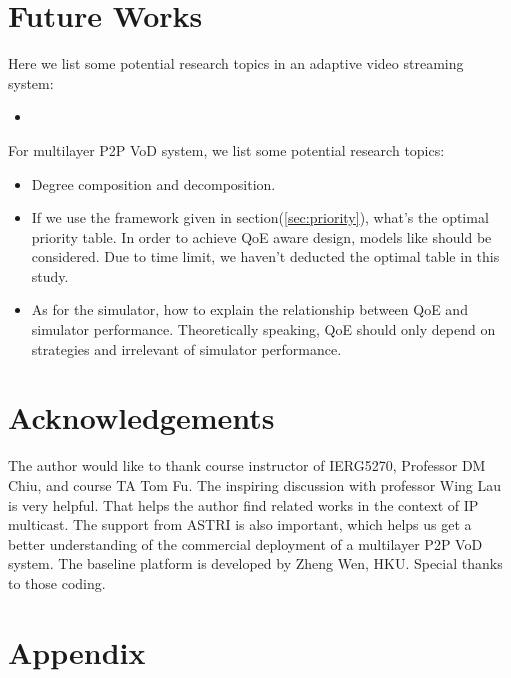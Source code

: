 \documentclass[11pt,a4paper]{article}
\begin{document}
\section{Future Works}

Here we list some potential research topics in an adaptive video streaming 
system:
\begin{itemize}
	\item 
\end{itemize} 

For multilayer P2P VoD system, we list some potential research topics:
\begin{itemize}
	\item Degree composition and decomposition. 
	\item If we use the framework given in section(\ref{sec:priority}), 
	what's the optimal priority table. In order to achieve QoE aware design, 
	models like \cite{wang2011-perceptual} should be considered. Due to 
	time limit, we haven't deducted the optimal table in this study. 
	\item As for the simulator, how to explain the relationship between 
	QoE and simulator performance. Theoretically speaking, QoE should only 
	depend on strategies and irrelevant of simulator performance. 
\end{itemize}



\section*{Acknowledgements}

The author would like to thank course instructor of IERG5270, Professor
DM Chiu, and course TA Tom Fu. The inspiring discussion with professor 
Wing Lau is very helpful. That helps the author find related works 
in the context of IP multicast. The support from ASTRI\cite{astri} is also important, 
which helps us get a better understanding of the commercial deployment
of a multilayer P2P VoD system. The baseline platform is developed 
by Zheng Wen, HKU. Special thanks to those coding. 


\pagebreak
\section*{Appendix}


\pagebreak
{}

\end{document}
